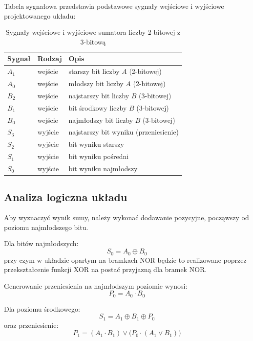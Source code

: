\documentclass[11pt]{article}
\begin{document}
Tabela sygnałowa przedstawia podstawowe sygnały wejściowe i wyjściowe projektowanego układu:
\begin{table}[H]
\centering
\caption{Sygnały wejściowe i wyjściowe sumatora liczby 2-bitowej z 3-bitową}
\label{tab:sygnaly}
\begin{tabular}{lll}
\toprule
Sygnał & Rodzaj & Opis \\
\midrule
\(A_1\) & wejście & starszy bit liczby \(A\) (2-bitowej) \\
\(A_0\) & wejście & młodszy bit liczby \(A\) (2-bitowej) \\
\(B_2\) & wejście & najstarszy bit liczby \(B\) (3-bitowej) \\
\(B_1\) & wejście & bit środkowy liczby \(B\) (3-bitowej) \\
\(B_0\) & wejście & najmłodszy bit liczby \(B\) (3-bitowej) \\
\(S_3\) & wyjście & najstarszy bit wyniku (przeniesienie) \\
\(S_2\) & wyjście & bit wyniku starszy \\
\(S_1\) & wyjście & bit wyniku pośredni \\
\(S_0\) & wyjście & bit wyniku najmłodszy \\
\bottomrule
\end{tabular}
\end{table}

\subsection{Analiza logiczna układu}

Aby wyznaczyć wynik sumy, należy wykonać dodawanie pozycyjne, począwszy od poziomu najmłodszego bitu.

Dla bitów najmłodszych:
\begin{equation}
S_0 = A_0 \oplus B_0
\end{equation}
przy czym w układzie opartym na bramkach NOR będzie to realizowane poprzez przekształcenie funkcji XOR na postać przyjazną dla bramek NOR.

Generowanie przeniesienia na najmłodszym poziomie wynosi:
\begin{equation}
P_0 = A_0 \cdot B_0
\end{equation}

Dla poziomu środkowego:
\begin{equation}
S_1 = A_1 \oplus B_1 \oplus P_0
\end{equation}
oraz przeniesienie:
\begin{equation}
P_1 = (A_1 \cdot B_1) \lor \bigl(P_0 \cdot (A_1 \lor B_1)\bigr)
\end{equation}
\end{document}
